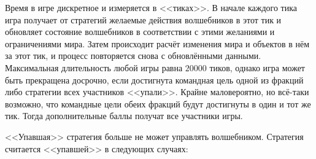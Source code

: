 Время в игре дискретное и измеряется в <<тиках>>. В начале каждого тика игра получает от стратегий желаемые действия волшебников в этот тик
и обновляет состояние волшебников в соответствии с этими желаниями и ограничениями мира. Затем происходит расчёт изменения мира и объектов в
нём за этот тик, и процесс повторяется снова с обновлёнными данными. Максимальная длительность любой игры равна $20000$ тиков, однако игра
может быть прекращена досрочно, если достигнута командная цель одной из фракций либо стратегии всех участников <<упали>>. Крайне
маловероятно, но всё-таки возможно, что командные цели обеих фракций будут достигнуты в один и тот же тик. Тогда дополнительные баллы
получат все участники игры.

<<Упавшая>> стратегия больше не может управлять волшебником. Стратегия считается <<упавшей>> в следующих случаях:
